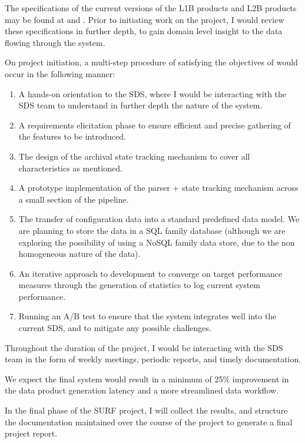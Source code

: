 \documentclass{article}
\begin{document}
\begin{multicols*}{2}
The specifications of the current versions of the L1B products and L2B products may be found at \cite{L1B_data_product} and \cite{L2_data_product}. Prior to initiating work on the project, I would review these specifications in further depth, to gain domain level insight to the data flowing through the system.

On project initiation, a multi-step procedure of satisfying the objectives of would occur in the following manner:
\begin{enumerate}
\itemsep0em
\item A hands-on orientation to the SDS, where I would be interacting with the SDS team to understand in further depth the nature of the system.
\item A requirements elicitation phase to ensure efficient and precise gathering of the features to be introduced.
\item The design of the archival state tracking mechanism to cover all characteristics as mentioned.
\item A prototype implementation of the parser + state tracking mechanism across a small section of the pipeline.
\item The transfer of configuration data into a standard predefined data model. We are planning to store the data in a SQL family database (although we are exploring the possibility of using a NoSQL family data store, due to the non homogeneous nature of the data).
\item An iterative approach to development to converge on target performance measures through the generation of statistics to log current system performance.
\item Running an A/B test to ensure that the system integrates well into the current SDS, and to mitigate any possible challenges.
\end{enumerate}

Throughout the duration of the project, I would be interacting with the SDS team in the form of weekly meetings, periodic reports, and timely documentation.

We expect the final system would result in a minimum of 25\% improvement in the data product generation latency and a more streamlined data workflow.

In the final phase of the SURF project, I will collect the results, and structure the documentation maintained over the course of the project to generate a final project report.


\end{multicols*}
\end{document}
